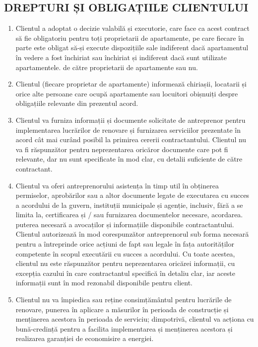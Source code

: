 \begin{multicols}{2}
\subsection{DREPTURI ȘI OBLIGAȚIILE CLIENTULUI}
\begin{enumerate}
\item Clientul a adoptat o decizie valabilă și executorie, care face ca acest contract să fie obligatoriu pentru toți proprietarii de apartamente, pe care fiecare în parte este obligat să-și execute dispozițiile sale indiferent dacă apartamentul în vedere a fost închiriat sau închiriat și indiferent dacă sunt utilizate apartamentele. de către proprietarii de apartamente sau nu.
\item Clientul (fiecare proprietar de apartamente) informează chiriașii, locatarii și orice alte persoane care ocupă apartamente sau locuitori obișnuiți despre obligațiile relevante din prezentul acord.
\item Clientul va furniza informații și documente solicitate de antreprenor pentru implementarea lucrărilor de renovare și furnizarea serviciilor prezentate în acord cât mai curând posibil la primirea cererii contractantului. Clientul nu va fi răspunzător pentru neprezentarea oricăror documente care pot fi relevante, dar nu sunt specificate în mod clar, cu detalii suficiente de către contractant.
\item Clientul va oferi antreprenorului asistența în timp util în obținerea permiselor, aprobărilor sau a altor documente legate de executarea cu succes a acordului de la guvern, instituții municipale și agenție, inclusiv, fără a se limita la, certificarea și / sau furnizarea documentelor necesare, acordarea. puterea necesară a avocaților și informațiile disponibile contractantului. Clientul autorizează în mod corespunzător antreprenorul sub forma necesară pentru a întreprinde orice acțiuni de fapt sau legale în fața autorităților competente în scopul executării cu succes a acordului. Cu toate acestea, clientul nu este răspunzător pentru neprezentarea oricărei informații, cu excepția cazului în care contractantul specifică în detaliu clar, iar aceste informații sunt în mod rezonabil disponibile pentru client.
\item Clientul nu va împiedica sau reține consimțământul pentru lucrările de renovare, punerea în aplicare a măsurilor în perioada de construcție și menținerea acestora în perioada de serviciu; dimpotrivă, clientul va acționa cu bună-credință pentru a facilita implementarea și menținerea acestora și realizarea garanției de economisire a energiei.

\end{enumerate}
\end{multicols}
